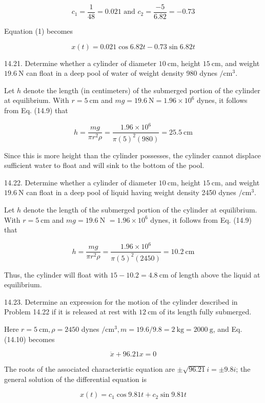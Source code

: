\documentclass[10pt]{article}
\begin{document}
$$
c_{1}=\frac{1}{48}=0.021 \text { and } c_{2}=\frac{-5}{6.82}=-0.73
$$

Equation (1) becomes

$$
x(t)=0.021 \cos 6.82 t-0.73 \sin 6.82 t
$$

14.21. Determine whether a cylinder of diameter $10 \mathrm{~cm}$, height $15 \mathrm{~cm}$, and weight $19.6 \mathrm{~N}$ can float in a deep pool of water of weight density 980 dynes $/ \mathrm{cm}^{3}$.

Let $h$ denote the length (in centimeters) of the submerged portion of the cylinder at equilibrium. With $r=5 \mathrm{~cm}$ and $m g=19.6 \mathrm{~N}=1.96 \times 10^{6}$ dynes, it follows from Eq. (14.9) that

$$
h=\frac{m g}{\pi r^{2} \rho}=\frac{1.96 \times 10^{6}}{\pi(5)^{2}(980)}=25.5 \mathrm{~cm}
$$

Since this is more height than the cylinder possesses, the cylinder cannot displace sufficient water to float and will sink to the bottom of the pool.

14.22. Determine whether a cylinder of diameter $10 \mathrm{~cm}$, height $15 \mathrm{~cm}$, and weight $19.6 \mathrm{~N}$ can float in a deep pool of liquid having weight density 2450 dynes $/ \mathrm{cm}^{3}$.

Let $h$ denote the length of the submerged portion of the cylinder at equilibrium. With $r=5 \mathrm{~cm}$ and $m g=19.6 \mathrm{~N}$ $=1.96 \times 10^{6}$ dynes, it follows from Eq. (14.9) that

$$
h=\frac{m g}{\pi r^{2} \rho}=\frac{1.96 \times 10^{6}}{\pi(5)^{2}(2450)}=10.2 \mathrm{~cm}
$$

Thus, the cylinder will float with $15-10.2=4.8 \mathrm{~cm}$ of length above the liquid at equilibrium.

14.23. Determine an expression for the motion of the cylinder described in Problem 14.22 if it is released at rest with $12 \mathrm{~cm}$ of its length fully submerged.

Here $r=5 \mathrm{~cm}, \rho=2450$ dynes $/ \mathrm{cm}^{3}, m=19.6 / 9.8=2 \mathrm{~kg}=2000 \mathrm{~g}$, and Eq. (14.10) becomes

$$
\ddot{x}+96.21 x=0
$$

The roots of the associated characteristic equation are $\pm \sqrt{96.21} i= \pm 9.8 i$; the general solution of the differential equation is


\begin{equation*}
x(t)=c_{1} \cos 9.81 t+c_{2} \sin 9.81 t \tag{1}
\end{equation*}
\end{document}
